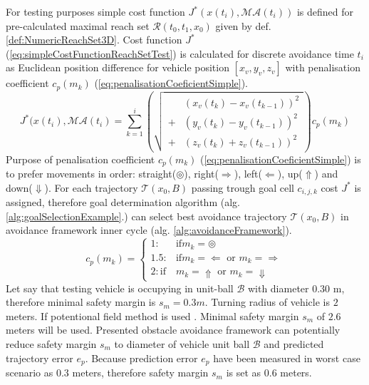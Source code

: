 \noindent For testing purposes simple cost function $J^*(x(t_i),\mathscr{MA}(t_i))$ is defined for pre-calculated maximal reach set $\mathscr{R}(t_0,t_1,x_0)$ given by def. \ref{def:NumericReachSet3D}. Cost function $J^*$ (\ref{eq:simpleCostFunctionReachSetTest}) is calculated for discrete avoidance time $t_i$ as Euclidean position difference for vehicle position $[x_v,y_v,z_v]$ with penalisation coefficient $c_p(m_k)$ (\ref{eq:penalisationCoeficientSimple}).
\begin{equation}\label{eq:simpleCostFunctionReachSetTest}
    J^*(x(t_i),\mathscr{MA}(t_i) = \sum_{k=1}^i \left(\sqrt{ 
    \begin{aligned}
    &\left(x_v(t_k)-x_v(t_{k-1})\right)^2\\
    +&\left(y_v(t_k)-y_v(t_{k-1})\right)^2\\
    +&\left(z_v(t_k)+z_v(t_{k-1})\right)^2 
    \end{aligned}}\right)c_p(m_k) 
\end{equation}
Purpose of penalisation coefficient $c_p(m_k)$ (\ref{eq:penalisationCoeficientSimple}) is to prefer movements in order: straight($\circledcirc$), right($\Rightarrow$), left($\Leftarrow$), up($\Uparrow$) and down($\Downarrow$). For each trajectory $\mathscr{T}(x_0,B)$ passing trough goal cell $c_{i,j,k}$ cost $J^*$ is assigned, therefore goal determination algorithm (alg. \ref{alg:goalSelectionExample}.) can select best avoidance trajectory $\mathscr{T}(x_0,B)$ in avoidance framework inner cycle (alg. \ref{alg:avoidanceFramework}).
\begin{equation}\label{eq:penalisationCoeficientSimple}
    c_p(m_k)=
    \begin{cases}
        1 :&\text{if} m_k =\circledcirc \\
        1.5 :&\text{if} m_k = \Leftarrow\text{ or }m_k = \Rightarrow\\
        2 :\text{if}& m_k = \Uparrow\text{ or }m_k = \Downarrow
    \end{cases}
\end{equation}
Let say that testing vehicle is occupying in unit-ball $\mathscr{B}$ with diameter $0.30$ m, therefore minimal safety margin is $s_m=0.3m$. Turning radius of vehicle is $2$ meters. If potentional field method is used \cite{koren1991potential}. Minimal safety margin $s_m$ of  $2.6$ meters will be used. Presented obstacle avoidance framework can potentially reduce safety margin $s_m$ to diameter of vehicle unit ball $\mathscr{B}$ and predicted trajectory error $e_p$. Because prediction error $e_p$ have been measured in worst case scenario as $0.3$ meters, therefore safety margin $s_m$ is set as $0.6$ meters. 

